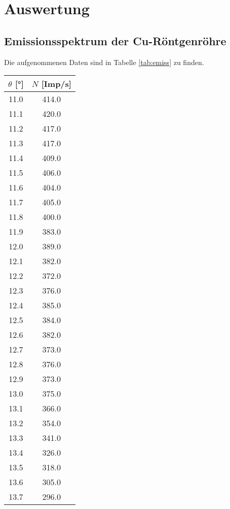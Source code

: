 \section{Auswertung}
\label{sec:Auswertung}

\subsection{Emissionsspektrum der Cu-Röntgenröhre}

Die aufgenommenen Daten sind in Tabelle \ref{tab:emiss} zu finden.

\begin{table}
    \centering
    \begin{tabular}{c c}
        \toprule
        $\theta$ [°] & $N$ [Imp/s] \\
        \midrule
        11.0	&	414.0\\
        11.1	&	420.0\\
        11.2	&	417.0\\
        11.3	&	417.0\\
        11.4	&	409.0\\
        11.5	&	406.0\\
        11.6	&	404.0\\
        11.7	&	405.0\\
        11.8	&	400.0\\
        11.9	&	383.0\\
        12.0	&	389.0\\
        12.1	&	382.0\\
        12.2	&	372.0\\
        12.3	&	376.0\\
        12.4	&	385.0\\
        12.5	&	384.0\\
        12.6	&	382.0\\
        12.7	&	373.0\\
        12.8	&	376.0\\
        12.9	&	373.0\\
        13.0	&	375.0\\
        13.1	&	366.0\\
        13.2	&	354.0\\
        13.3	&	341.0\\
        13.4	&	326.0\\
        13.5	&	318.0\\
        13.6	&	305.0\\
        13.7	&	296.0\\

\end{tabular}
\end{table}
